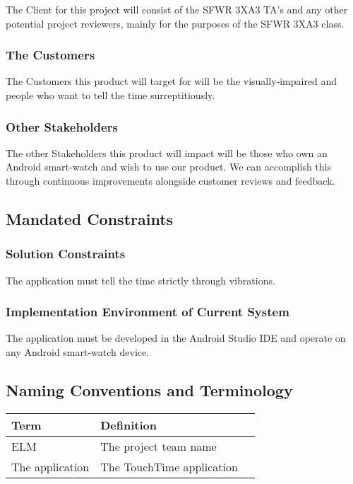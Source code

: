 \documentclass[12pt, titlepage]{article}
\begin{document}
The Client for this project will consist of the SFWR 3XA3 TA's and any other potential project reviewers, mainly for the purposes of the SFWR 3XA3 class.  

\subsubsection{The Customers}

The Customers this product will target for will be the visually-impaired and people who want to tell the time surreptitiously.

\subsubsection{Other Stakeholders}

The other Stakeholders this product will impact will be those who own an Android smart-watch and wish to use our product. We can accomplish this through continuous improvements alongside customer reviews and feedback. 

\subsection{Mandated Constraints}
\subsubsection{Solution Constraints}

The application must tell the time strictly through vibrations.

\subsubsection{Implementation Environment of Current System}

The application must be developed in the Android Studio IDE and operate on any Android smart-watch device. 

\subsection{Naming Conventions and Terminology}

\begin{center}
    \begin{tabular}{| l | l | p{5cm} | }
    \hline
    Term & Definition \\ \hline
    ELM & The project team name \\ \hline
    The application & The TouchTime application \\ \hline
    \end{tabular}
\end{center}
\end{document}
